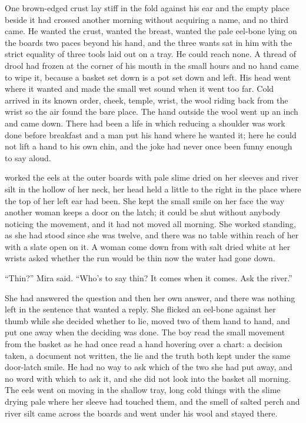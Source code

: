 One brown-edged crust lay stiff in the fold against his ear and the empty place beside it had crossed another morning without acquiring a name, and no third came. He wanted the crust, wanted the breast, wanted the pale eel-bone lying on the boards two paces beyond his hand, and the three wants sat in him with the strict equality of three tools laid out on a tray. He could reach none. A thread of drool had frozen at the corner of his mouth in the small hours and no hand came to wipe it, because a basket set down is a pot set down and left. His head went where it wanted and made the small wet sound when it went too far. Cold arrived in its known order, cheek, temple, wrist, the wool riding back from the wrist so the air found the bare place. The hand outside the wool went up an inch and came down. There had been a life in which reducing a shoulder was work done before breakfast and a man put his hand where he wanted it; here he could not lift a hand to his own chin, and the joke had never once been funny enough to say aloud.

\scenebreak

 worked the eels at the outer boards with pale slime dried on her sleeves and river silt in the hollow of her neck, her head held a little to the right in the place where the top of her left ear had been. She kept the small smile on her face the way another woman keeps a door on the latch; it could be shut without anybody noticing the movement, and it had not moved all morning. She worked standing, as she had stood since she was twelve, and there was no table within reach of her with a slate open on it. A woman come down from  with salt dried white at her wrists asked whether the run would be thin now the water had gone down.

“Thin?” Mira said. “Who's to say thin? It comes when it comes. Ask the river.”

She had answered the question and then her own answer, and there was nothing left in the sentence that wanted a reply. She flicked an eel-bone against her thumb while she decided whether to lie, moved two of them hand to hand, and put one away when the deciding was done. The boy read the small movement from the basket as he had once read a hand hovering over a chart: a decision taken, a document not written, the lie and the truth both kept under the same door-latch smile. He had no way to ask which of the two she had put away, and no  word with which to ask it, and she did not look into the basket all morning. The eels went on moving in the shallow tray, long cold things with the slime drying pale where her sleeve had touched them, and the smell of salted perch and river silt came across the boards and went under his wool and stayed there.

